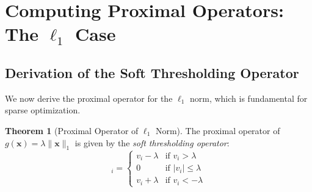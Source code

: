 \documentclass[12pt]{article}
\renewcommand{\vec}[1]{\mathbf{#1}}
\DeclareMathOperator{\prox}{prox}
\newcommand{\norm}[1]{\lVert #1 \rVert}
\newcommand{\abs}[1]{\lvert #1 \rvert}
\theoremstyle{definition}
\newtheorem{theorem}{Theorem}[section]
\begin{document}
\newpage
\section{Computing Proximal Operators: The $\ell_1$ Case}

\subsection{Derivation of the Soft Thresholding Operator}

We now derive the proximal operator for the $\ell_1$ norm, which is fundamental for sparse optimization.

\begin{theorem}[Proximal Operator of $\ell_1$ Norm]\label{thm:soft_threshold}
    The proximal operator of $g(\vec{x}) = \lambda\norm{\vec{x}}_1$ is given by the \textit{soft thresholding operator}:
    \begin{equation}
        [\prox_{\lambda\norm{\cdot}_1}(\vec{v})]_i = \begin{cases}
            v_i - \lambda & \text{if } v_i > \lambda          \\
            0             & \text{if } \abs{v_i} \leq \lambda \\
            v_i + \lambda & \text{if } v_i < -\lambda
        \end{cases}
    \end{equation}
\end{theorem}
\end{document}
